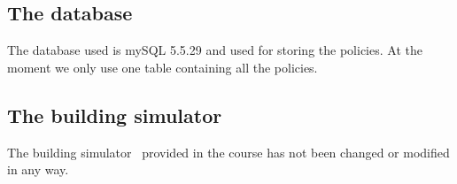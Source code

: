 \subsection{The database}
The database used is mySQL 5.5.29 and used for storing the policies. At the moment we only use one table containing all the policies.

\subsection{The building simulator}
The building simulator~\cite{simulator} provided in the course has not been changed or modified in any way.